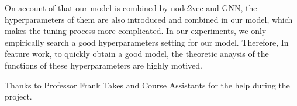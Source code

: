 \documentclass[sigconf]{acmart}
\begin{document}
On account of that our model is combined by node2vec and GNN, the hyperparameters of them are also introduced and combined in our model, which makes the tuning process more complicated. In our experiments, we only empirically search a good hyperparameters setting for our model. Therefore, In feature work, to quickly obtain a good model, the theoretic anaysis of the functions of these hyperparameters are highly motived.

\begin{acks}
Thanks to Professor Frank Takes and Course Assistants for the help during the project.
\end{acks}




\end{document}
